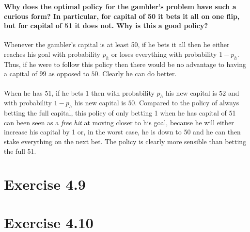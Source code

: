 \documentclass[a4paper,11pt]{article}
\numberwithin{equation}{section}
\theoremstyle{remark}
\begin{document}
\textbf{Why does the optimal policy for the gambler’s problem have such a curious form? In particular, for capital of 50 it bets it all on one flip, but for capital of 51 it does not. Why is this a good policy?}
\\ \\
Whenever the gambler's capital is at least 50, if he bets it all then he either reaches his goal with probability $p_h$ or loses everything with probability $1 - p_h$. Thus, if he were to follow this policy then there would be no advantage to having a capital of $99$ as opposed to $50$. Clearly he can do better. 
\\ \\
When he has 51, if he bets 1 then with probability $p_h$ his new capital is $52$ and with probability $1 - p_h$ his new capital is $50$. Compared to the policy of always betting the full capital, this policy of only betting 1 when he has capital of 51 can been seen as a \emph{free hit} at moving closer to his goal, because he will either increase his capital by 1 or, in the worst case, he is down to 50 and he can then stake everything on the next bet. The policy is clearly more sensible than betting the full 51.  

\section{Exercise 4.9}


\section{Exercise 4.10}
\end{document}
